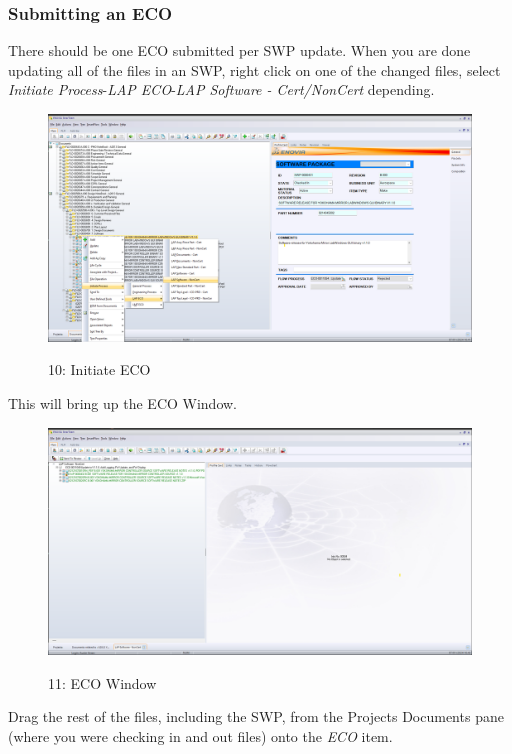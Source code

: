 \documentclass[10pt]{article}
\begin{document}
            \subsubsection{Submitting an ECO}
                There should be one ECO submitted per SWP update. When you are done updating all of the files in an SWP, right click on one of the changed files, select \emph{Initiate Process}-\emph{LAP ECO}-\emph{LAP Software - Cert/NonCert} depending.
                \begin{figure}[H]
                    \centerline{\includegraphics[width=\textwidth]{References/ST ECO Initiate Process.png}}
                    \figurename{ 10: Initiate ECO}
                \end{figure}
                This will bring up the ECO Window.
                \begin{figure}[H]
                    \centerline{\includegraphics[width=\textwidth]{References/ST ECO Window.png}}
                    \figurename{ 11: ECO Window}
                \end{figure}
                Drag the rest of the files, including the SWP, from the Projects Documents pane (where you were checking in and out files) onto the \emph{ECO} item. \\
\end{document}

